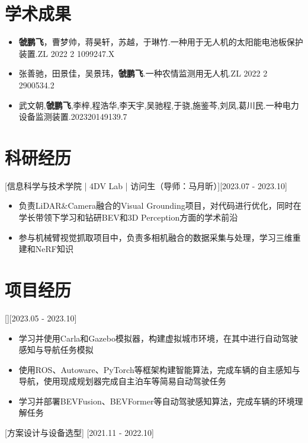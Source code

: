 \documentclass{resume}
\begin{document}
\section{学术成果}
\begin{itemize}
  \item \textbf{虢鹏飞}，曹梦帅，蒋昊轩，苏越，于琳竹.一种用于无人机的太阳能电池板保护装置.ZL 2022 2 1099247.X
  \item 张善驰，田景佳，吴景玮，\textbf{虢鹏飞}.一种农情监测用无人机.ZL 2022 2 2900534.2
  \item 武文朝,\textbf{虢鹏飞},李梓,程浩华,李天宇,吴驰程,于骁,施鉴芩,刘凤,葛川民.一种电力设备监测装置.202320149139.7
\end{itemize}
\section{科研经历}
[信息科学与技术学院 | 4DV Lab | 访问生（导师：马月昕）][2023.07 - 2023.10]
\begin{itemize}
    \item 负责LiDAR\&Camera融合的Visual Grounding项目，对代码进行优化，同时在学长带领下学习和钻研BEV和3D Perception方面的学术前沿
    \item 参与机械臂视觉抓取项目中，负责多相机融合的数据采集与处理，学习三维重建和NeRF知识
\end{itemize}
\section{项目经历}

[][2023.05 - 2023.10]
\begin{itemize}
    \item 学习并使用Carla和Gazebo模拟器，构建虚拟城市环境，在其中进行自动驾驶感知与导航任务模拟
    \item 使用ROS、Autoware、PyTorch等框架构建智能算法，完成车辆的自主感知与导航，使用现成规划器完成自主泊车等简易自动驾驶任务
    \item 学习并部署BEVFusion、BEVFormer等自动驾驶感知算法，完成车辆的环境理解任务
\end{itemize}
[方案设计与设备选型]
[2021.11 - 2022.10] 
\end{document}
